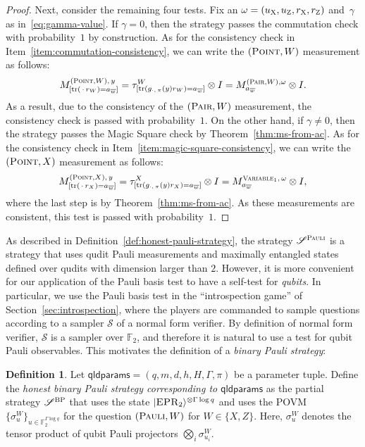 \documentclass[11pt]{article}
\theoremstyle{definition}
\newtheorem{definition}[theorem]{Definition}
\newcommand{\ket}[1]{|#1\rangle}
\newcommand{\F}{\ensuremath{\mathbb{F}}}
\DeclareMathOperator{\tr}{tr}
\newcommand{\sampler}{\mathcal{S}}
\newcommand{\strategy}{\mathscr{S}}
\newcommand{\gamestyle}[1]{\ensuremath{\textsc{#1}}\xspace}
\newcommand{\pauli}{\gamestyle{Pauli}}
\newcommand{\bp}{\gamestyle{BP}}
\newcommand{\labelstyle}[1]{\ensuremath{\textsc{#1}}\xspace}
\newcommand{\EPR}{\labelstyle{EPR}}
\newcommand{\xpt}{\labelstyle{X}}
\newcommand{\zpt}{\labelstyle{Z}}
\newcommand{\typestyle}[1]{\ensuremath{\textsc{#1}}\xspace}
\newcommand{\Point}{\typestyle{Point}}
\newcommand{\Pair}{\typestyle{Pair}}
\newcommand{\Variable}{\typestyle{Variable}}
\newcommand{\Pauli}{\typestyle{Pauli}}
\newcommand{\qldparams}{\mathsf{qldparams}}
\begin{document}
\begin{proof}
  Next, consider the remaining four tests.
  Fix an $\omega= (u_\xpt, u_\zpt, r_\xpt, r_\zpt)$ and~$\gamma$ as
  in~\eqref{eq:gamma-value}.
  If $\gamma = 0$, then the strategy passes the commutation check with
  probability~$1$ by construction.
  As for the consistency check in Item~\ref{item:commutation-consistency},
  we can write the $(\Point, W)$ measurement as follows: 
  \begin{equation*}
  M^{(\Point,W),\, y}_{[\tr(\,\cdot\, r_W) = a_{\overline{w}}]}
  = \tau^W_{[\tr(g_{\cdot,\, \pi}(y)r_W) = a_{\overline{w}}]} \otimes I
  = M^{(\Pair, W), \omega}_{a_{\overline{w}}} \otimes I.
  \end{equation*}
  As a result, due to the consistency of the $(\Pair, W)$ measurement, the consistency check is passed with probability~$1$.
  On the other hand, if $\gamma \neq 0$,
  then the strategy passes the Magic Square check by Theorem~\ref{thm:ms-from-ac}.
  As for the consistency check in Item~\ref{item:magic-square-consistency},
  we can write the $(\Point, X)$ measurement as follows: 
  \begin{equation*}
  M^{(\Point,X),\, y}_{[\tr(\,\cdot\, r_X) = a_{\overline{w}}]}
  = \tau^X_{[\tr(g_{\cdot,\, \pi}(y)r_X) = a_{\overline{w}}]} \otimes I
  = M^{\Variable_1,\, \omega}_{a_{\overline{w}}} \otimes I,
  \end{equation*}
  where the last step is by Theorem~\ref{thm:ms-from-ac}.
  As these measurements are consistent, this test is passed with probability~$1$.
\end{proof}

As described in Definition~\ref{def:honest-pauli-strategy}, the strategy
$\strategy^\pauli$ is a strategy that uses qudit Pauli measurements and
maximally entangled states defined over qudits with dimension larger than $2$.
However, it is more convenient for our application of the Pauli basis test to
have a self-test for \emph{qubits}.
In particular, we use the Pauli basis test in the ``introspection game'' of
Section~\ref{sec:introspection}, where the players are commanded to sample
questions according to a sampler $\sampler$ of a normal form verifier.
By definition of normal form verifier, $\sampler$ is a sampler over $\F_2$, and
therefore it is natural to use a test for qubit Pauli observables.
This motivates the definition of a \emph{binary Pauli strategy}:

\begin{definition}
  \label{def:binary-pauli-strategy}
  Let $\qldparams = (q,m,d,h,H,\Gamma,\pi)$ be a parameter tuple.
  Define the \emph{honest binary Pauli strategy corresponding to $\qldparams$}
  as the partial strategy $\strategy^\bp$ that uses the state
  $\ket{\EPR_2}^{\otimes \Gamma \log q}$ and uses the POVM $\{\sigma^W_u\}_{u\in
    \F_2^{\Gamma \log q}}$ for the question $(\Pauli, W)$ for $W\in \{X,Z\}$.
  Here, $\sigma^W_u$ denotes the tensor product of qubit Pauli projectors
  $\bigotimes_i \sigma^W_{u_i}$.
\end{definition}
\end{document}

